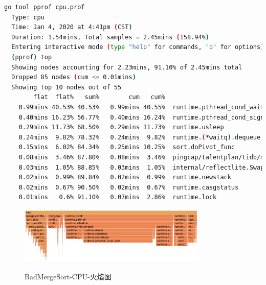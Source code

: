\documentclass[UTF8]{ctexart}
\begin{document}
\begin{lstlisting}[language=bash]
  go tool pprof cpu.prof                                                                                                      
  Type: cpu
  Time: Jan 4, 2020 at 4:41pm (CST)
  Duration: 1.54mins, Total samples = 2.45mins (158.94%)
  Entering interactive mode (type "help" for commands, "o" for options)
  (pprof) top
  Showing nodes accounting for 2.23mins, 91.10% of 2.45mins total
  Dropped 85 nodes (cum <= 0.01mins)
  Showing top 10 nodes out of 55
        flat  flat%   sum%        cum   cum%
    0.99mins 40.53% 40.53%   0.99mins 40.55%  runtime.pthread_cond_wait
    0.40mins 16.23% 56.77%   0.40mins 16.24%  runtime.pthread_cond_signal
    0.29mins 11.73% 68.50%   0.29mins 11.73%  runtime.usleep
    0.24mins  9.82% 78.32%   0.24mins  9.82%  runtime.(*waitq).dequeue
    0.15mins  6.02% 84.34%   0.25mins 10.25%  sort.doPivot_func
    0.08mins  3.46% 87.80%   0.08mins  3.46%  pingcap/talentplan/tidb/mergesort.BadMergeSort.func1.1
    0.03mins  1.05% 88.85%   0.03mins  1.05%  internal/reflectlite.Swapper.func5
    0.02mins  0.99% 89.84%   0.02mins  0.99%  runtime.newstack
    0.02mins  0.67% 90.50%   0.02mins  0.67%  runtime.casgstatus
    0.01mins   0.6% 91.10%   0.07mins  2.86%  runtime.lock
\end{lstlisting}

\begin{figure}[H]
  \centering
  \includegraphics[width=0.8\textwidth]{fig/bad-cpu.png}\\
  \caption{BadMergeSort-CPU-火焰图}
  \label{mre1}
\end{figure}
\end{document}
